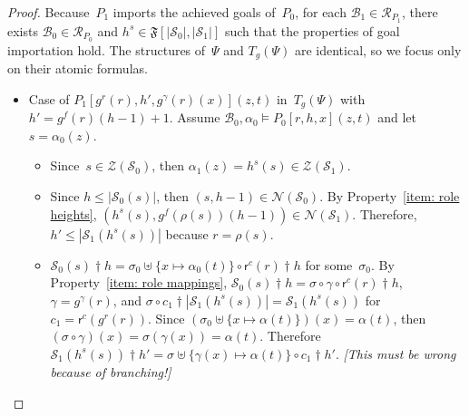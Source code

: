 \documentclass[12pt]{article}
\newcommand{\remark}[1]{\emph{[#1]}}
\newcommand{\prefix}[2]{#1\dagger#2}
\newcommand{\alg}[1]{\ensuremath{\mathfrak{#1}}}
\newcommand{\ssp}{\ensuremath{\mathcal{S}}}
\newcommand{\bun}{\ensuremath{\mathcal{B}}}
\newcommand{\strands}{\ensuremath{\mathcal{Z}}}
\newcommand{\nodes}{\ensuremath{\mathcal{N}}}
\newcommand{\run}{\mathcal{R}}
\newcommand{\rl}{\ensuremath{\rho}}
\newcommand{\role}{\mathsf{r}}
\begin{document}
\begin{proof}
Because~$P_1$ imports the achieved goals of~$P_0$, for each
$\bun_1\in\run_{P_1}$, there exists $\bun_0\in\run_{P_0}$ and
$h^s\in\alg{F}[|\ssp_0|, |\ssp_1|]$ such that the properties of goal
importation hold.  The structures of~$\Psi$ and $T_g(\Psi)$ are
identical, so we focus only on their atomic formulas.

\begin{itemize}
\item Case of $P_1[g^r(r),h',g^\gamma(r)(x)](z,t)$ in~$T_g(\Psi)$ with
  $h'=g^f(r)(h-1)+1$.  Assume $\bun_0,\alpha_0\models P_0[r,h,x](z,t)$
  and let~$s=\alpha_0(z)$.
  \begin{itemize}
  \item Since~$s\in\strands(\ssp_0)$, then
    $\alpha_1(z)=h^s(s)\in\strands(\ssp_1)$.
  \item Since $h\leq|\ssp_0(s)|$, then $(s,h-1)\in\nodes(\ssp_0)$.  By
    Property~\ref{item: role heights},
    $(h^s(s),g^f(\rl(s))(h-1))\in\nodes(\ssp_1)$.  Therefore,
    $h'\leq|\ssp_1(h^s(s))|$ because $r=\rl(s)$.
  \item
    $\prefix{\ssp_0(s)}{h}=\sigma_0\uplus\{x\mapsto\alpha_0(t)\}\circ
    \prefix{\role^{c}(r)}{h}$ for some~$\sigma_0$.  By
    Property~\ref{item: role mappings},
    $\prefix{\ssp_0(s)}{h}=\sigma\circ\gamma\circ\prefix{\role^c(r)}{h}$,
    $\gamma=g^\gamma(r)$, and
    $\sigma\circ\prefix{c_1}{|\ssp_1(h^s(s))|}=\ssp_1(h^s(s))$ for
    $c_1=\role^c(g^r(r))$.  Since
    $(\sigma_0\uplus\{x\mapsto\alpha(t)\})(x)=\alpha(t)$, then
    $(\sigma\circ\gamma)(x) =\sigma(\gamma(x))=\alpha(t)$.
    Therefore $\prefix{\ssp_1(h^s(s))}{h'}=\sigma\uplus
    \{\gamma(x)\mapsto\alpha(t)\}\circ \prefix{c_1}{h'}$.
    \remark{This must be wrong because of branching!}
  \end{itemize}


\end{itemize}
\end{proof}
\end{document}
